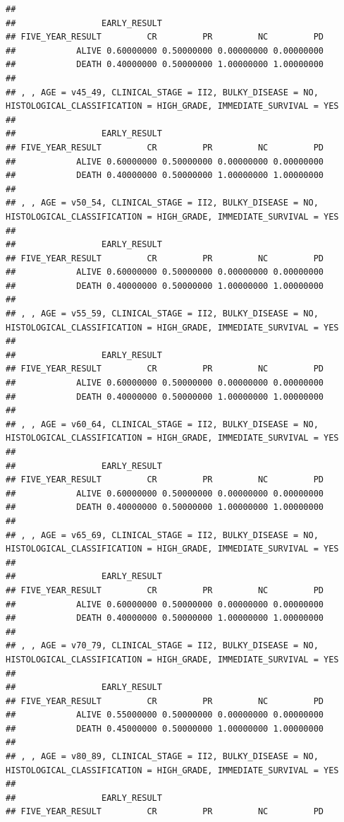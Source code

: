 \documentclass[]{article}
\begin{document}
\begin{verbatim}
## 
##                 EARLY_RESULT
## FIVE_YEAR_RESULT         CR         PR         NC         PD
##            ALIVE 0.60000000 0.50000000 0.00000000 0.00000000
##            DEATH 0.40000000 0.50000000 1.00000000 1.00000000
## 
## , , AGE = v45_49, CLINICAL_STAGE = II2, BULKY_DISEASE = NO, HISTOLOGICAL_CLASSIFICATION = HIGH_GRADE, IMMEDIATE_SURVIVAL = YES
## 
##                 EARLY_RESULT
## FIVE_YEAR_RESULT         CR         PR         NC         PD
##            ALIVE 0.60000000 0.50000000 0.00000000 0.00000000
##            DEATH 0.40000000 0.50000000 1.00000000 1.00000000
## 
## , , AGE = v50_54, CLINICAL_STAGE = II2, BULKY_DISEASE = NO, HISTOLOGICAL_CLASSIFICATION = HIGH_GRADE, IMMEDIATE_SURVIVAL = YES
## 
##                 EARLY_RESULT
## FIVE_YEAR_RESULT         CR         PR         NC         PD
##            ALIVE 0.60000000 0.50000000 0.00000000 0.00000000
##            DEATH 0.40000000 0.50000000 1.00000000 1.00000000
## 
## , , AGE = v55_59, CLINICAL_STAGE = II2, BULKY_DISEASE = NO, HISTOLOGICAL_CLASSIFICATION = HIGH_GRADE, IMMEDIATE_SURVIVAL = YES
## 
##                 EARLY_RESULT
## FIVE_YEAR_RESULT         CR         PR         NC         PD
##            ALIVE 0.60000000 0.50000000 0.00000000 0.00000000
##            DEATH 0.40000000 0.50000000 1.00000000 1.00000000
## 
## , , AGE = v60_64, CLINICAL_STAGE = II2, BULKY_DISEASE = NO, HISTOLOGICAL_CLASSIFICATION = HIGH_GRADE, IMMEDIATE_SURVIVAL = YES
## 
##                 EARLY_RESULT
## FIVE_YEAR_RESULT         CR         PR         NC         PD
##            ALIVE 0.60000000 0.50000000 0.00000000 0.00000000
##            DEATH 0.40000000 0.50000000 1.00000000 1.00000000
## 
## , , AGE = v65_69, CLINICAL_STAGE = II2, BULKY_DISEASE = NO, HISTOLOGICAL_CLASSIFICATION = HIGH_GRADE, IMMEDIATE_SURVIVAL = YES
## 
##                 EARLY_RESULT
## FIVE_YEAR_RESULT         CR         PR         NC         PD
##            ALIVE 0.60000000 0.50000000 0.00000000 0.00000000
##            DEATH 0.40000000 0.50000000 1.00000000 1.00000000
## 
## , , AGE = v70_79, CLINICAL_STAGE = II2, BULKY_DISEASE = NO, HISTOLOGICAL_CLASSIFICATION = HIGH_GRADE, IMMEDIATE_SURVIVAL = YES
## 
##                 EARLY_RESULT
## FIVE_YEAR_RESULT         CR         PR         NC         PD
##            ALIVE 0.55000000 0.50000000 0.00000000 0.00000000
##            DEATH 0.45000000 0.50000000 1.00000000 1.00000000
## 
## , , AGE = v80_89, CLINICAL_STAGE = II2, BULKY_DISEASE = NO, HISTOLOGICAL_CLASSIFICATION = HIGH_GRADE, IMMEDIATE_SURVIVAL = YES
## 
##                 EARLY_RESULT
## FIVE_YEAR_RESULT         CR         PR         NC         PD

\end{verbatim}
\end{document}
